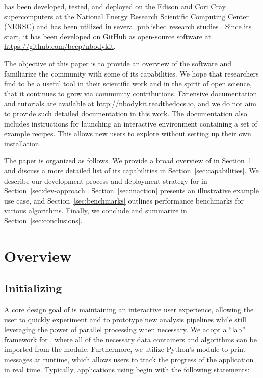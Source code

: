 \nbkit{} has been developed, tested, and deployed on the
Edison and Cori Cray supercomputers at the National Energy Research Scientific
Computing Center (NERSC) and has been
utilized in several published research studies
\citep{Hand:2017,Hand:2017b,Ding:2017,Pinol:2017,Schmittful:2017,Modi:2016,Feng:2016b,Waters:2016}.
Since its start, it has been developed on GitHub as open-source
software at \url{https://github.com/bccp/nbodykit}.

The objective of this paper is to
provide an overview of the \nbkit{} software and familiarize the community
with some of its capabilities.
We hope that researchers find \nbkit{}
to be a useful tool in their scientific work and in the spirit of open science,
that it continues to grow via community contributions.
Extensive documentation and tutorials are available at
\url{http://nbodykit.readthedocs.io}, and we do not aim to provide such
detailed documentation in this work. The documentation also
includes instructions for launching an interactive environment containing
a set of example recipes. This allows new users to explore \nbkit{} without
setting up their own \nbkit{} installation.

The paper is organized as follows. We provide a broad overview
of \nbkit{} in Section~\ref{sec:overview} and discuss a more detailed
list of its capabilities in Section~\ref{sec:capabilities}.
We describe our development process and deployment strategy for
\nbkit{} in Section~\ref{sec:dev-approach}.
Section~\ref{sec:inaction} presents an illustrative example use case,
and Section~\ref{sec:benchmarks} outlines performance benchmarks for various
algorithms. Finally, we conclude and summarize in
Section~\ref{sec:conclusions}.

\section{Overview}
\label{sec:overview}

\subsection{Initializing \nbkit{}}

A core design goal of \nbkit{} is maintaining an interactive user experience,
allowing the user to quickly experiment and to prototype new analysis pipelines
while still leveraging the power of parallel processing when necessary.
We adopt a ``lab'' framework for \nbkit{}, where all of the necessary data
containers and algorithms can be imported from the 
module. Furthermore, we utilize Python's  module to
print messages at runtime, which allows users to track the progress
of the application in real time.
Typically, applications using \nbkit{} begin with the following
statements:

